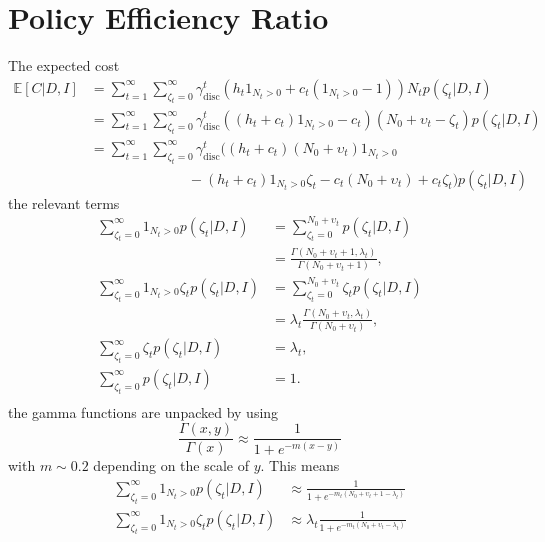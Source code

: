 \section{Policy Efficiency Ratio}
\label{app:cer}
The expected cost
\begin{equation}
	\begin{split}
		\mathbb{E}[C|D,I] &= \sum_{t=1}^{\infty}\sum_{\zeta_t=0}^\infty \gamma_{\text{disc}}^{t} \left( h_t 1_{N_t> 0} + c_t (1_{N_t> 0}-1) \right)N_tp(\zeta_t| D, I)\\
		&= \sum_{t=1}^{\infty}\sum_{\zeta_t=0}^\infty \gamma_{\text{disc}}^{t} \left( (h_t+c_t) 1_{N_t> 0} - c_t  \right)(N_0 + \upsilon_t-\zeta_t)p(\zeta_t| D, I)\\
		&= \sum_{t=1}^{\infty}\sum_{\zeta_t=0}^\infty \gamma_{\text{disc}}^{t} \bigg( 
		(h_t+c_t)(N_0 + \upsilon_t)1_{N_t> 0}\\
		&\qquad\qquad\qquad\quad-(h_t+c_t) 1_{N_t> 0}\zeta_t
		- c_t(N_0 + \upsilon_t)+c_t\zeta_t\bigg)p(\zeta_t| D, I)
	\end{split}
\end{equation}
the relevant terms
\begin{equation}
	\begin{split}
		\sum_{\zeta_t=0}^\infty1_{N_t> 0}p(\zeta_t| D, I) & = \sum_{\zeta_t=0}^{N_0+\upsilon_t} p(\zeta_t| D, I)\\
		&= \frac{\Gamma(N_0+\upsilon_t+1,\lambda_t)}{\Gamma(N_0+\upsilon_t+1)},\\
		\sum_{\zeta_t=0}^\infty1_{N_t> 0}\zeta_tp(\zeta_t| D, I) & = \sum_{\zeta_t=0}^{N_0+\upsilon_t} \zeta_t p(\zeta_t| D, I)\\
		& = \lambda_t \frac{\Gamma(N_0+\upsilon_t,\lambda_t)}{\Gamma(N_0+\upsilon_t)},\\
		\sum_{\zeta_t=0}^\infty\zeta_tp(\zeta_t| D, I) & = \lambda_t,\\
		\sum_{\zeta_t=0}^\infty p(\zeta_t| D, I) & = 1.\\
	\end{split}
\end{equation}
the gamma functions are unpacked by using 
\begin{equation}
	\frac{\Gamma(x,y)}{\Gamma(x)}\approx \frac{1}{1+e^{-m(x-y)}}
\end{equation}
with $m\sim 0.2$ depending on the scale of $y$. This means
\begin{equation}
	\begin{split}
		\sum_{\zeta_t=0}^\infty1_{N_t> 0}p(\zeta_t| D, I) & \approx \frac{1}{1+e^{-m_t(N_0+\upsilon_t+1-\lambda_t)}}\\
		\sum_{\zeta_t=0}^\infty1_{N_t> 0}\zeta_tp(\zeta_t| D, I) & \approx \lambda_t\frac{1}{1+e^{-m_t(N_0+\upsilon_t-\lambda_t)}}\\
	\end{split}
\end{equation}
